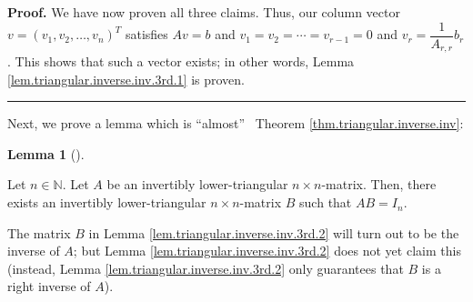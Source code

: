 \documentclass[numbers=enddot,12pt,final,onecolumn,notitlepage]{scrartcl}%
\theoremstyle{definition}
\newtheorem{lem}[theo]{Lemma}
\newenvironment{lemma}[1][]
{\begin{lem}[#1]\begin{leftbar}}
{\end{leftbar}\end{lem}}
\newenvironment{proof}[1][Proof]{\noindent\textbf{#1.} }{\ \rule{0.5em}{0.5em}}
\begin{document}
\begin{proof}
We have now proven all three claims. Thus, our column vector $v=\left(
v_{1},v_{2},\ldots,v_{n}\right)  ^{T}$ satisfies $Av=b$ and $v_{1}%
=v_{2}=\cdots=v_{r-1}=0$ and $v_{r}=\dfrac{1}{A_{r,r}}b_{r}$. This shows that
such a vector exists; in other words, Lemma
\ref{lem.triangular.inverse.inv.3rd.1} is proven.
\end{proof}

Next, we prove a lemma which is \textquotedblleft almost\textquotedblright%
\ Theorem \ref{thm.triangular.inverse.inv}:

\begin{lemma}
\label{lem.triangular.inverse.inv.3rd.2}Let $n\in\mathbb{N}$. Let $A$ be an
invertibly lower-triangular $n\times n$-matrix. Then, there exists an
invertibly lower-triangular $n\times n$-matrix $B$ such that $AB=I_{n}$.
\end{lemma}

The matrix $B$ in Lemma \ref{lem.triangular.inverse.inv.3rd.2} will turn out
to be the inverse of $A$; but Lemma \ref{lem.triangular.inverse.inv.3rd.2}
does not yet claim this (instead, Lemma \ref{lem.triangular.inverse.inv.3rd.2}
only guarantees that $B$ is a right inverse of $A$).
\end{document}
